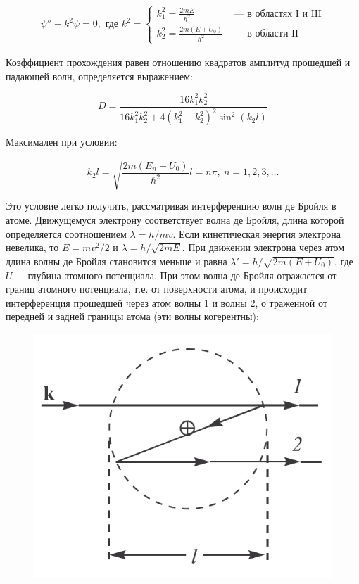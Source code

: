\documentclass[a4paper, 12pt]{article}%
\begin{document}
\begin{align}
	\psi'' + k^2 \psi = 0, \text{ где } k^2 = 
		\begin{cases}
			k_1^2 = \frac{2mE}{\hbar^2} & \text{~--- в областях I и III} \\
			k_2^2 = \frac{2m(E + U_0)}{\hbar^2} & \text{~--- в области II}
		\end{cases} 
\end{align}

	Коэффициент прохождения равен отношению квадратов амплитуд прошедшей и падающей волн, определяется выражением:
	
\[ D = \dfrac{16 k_1^2 k_2^2}{16 k_1^2 k_2^2 + 4(k_1^2 - k_2^2)^2 \sin^2(k_2l)}\]

	Максимален при условии:

\[k_2 l = \sqrt{\frac{2m(E_n + U_0)}{\hbar^2}}l = n \pi, \ n = 1, 2, 3, \ldots\]

	Это условие легко получить,  рассматривая интерференцию волн де Бройля в атоме.  Движущемуся электрону соответствует волна де Бройля,  длина которой определяется соотношением $\lambda = h / mv$.  Если кинетическая энергия электрона невелика,  то $E = mv^2 / 2$ и $\lambda = h / \sqrt{2mE}$.  При движении электрона через атом длина волны де Бройля становится меньше и равна $\lambda' = h / \sqrt{2m(E + U_0)}$,  где $U_0$ -- глубина атомного потенциала.  При этом волна де Бройля отражается от границ атомного потенциала, т.е. от поверхности атома,  и происходит интерференция прошедшей через атом волны 1 и волны 2, о траженной от передней и задней границы атома (эти волны когерентны):

	\begin{figure}[h!]
		\centering
		\includegraphics[scale=0.4]{Схема_2.PNG}
	\end{figure}
\end{document}
